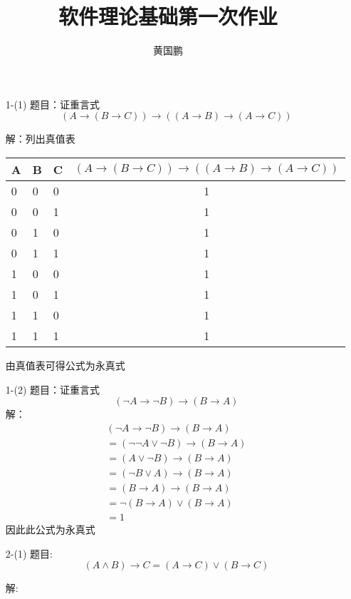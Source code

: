 \documentclass[11pt,oneside,a4paper]{article}
\author{黄国鹏}
\title{软件理论基础第一次作业 }
\begin{document}
\maketitle
    \begin{itemize}
        \item[1-(1)]
        题目：证重言式\[(A \to (B \to C)) \to ((A \to B) \to (A \to C))\] \par
        解：列出真值表
        \begin{table}[!h]
        \centering
            \begin{tabular}{|l|l|l|c|}
            \hline
            A  & B  & C  & $(A \to (B \to C)) \to ((A \to B) \to (A \to C))$ \\ \hline
            0  & 0 &  0  & 1 \\ \hline
            0  & 0 &  1  & 1\\ \hline
            0  & 1 &  0  & 1 \\ \hline
            0  & 1 &  1  & 1 \\ \hline
            1  & 0 &  0  & 1 \\ \hline
            1  & 0 &  1  & 1 \\ \hline
            1  & 1 &  0  & 1 \\ \hline
            1  & 1 &  1  & 1 \\ \hline
            \end{tabular}
            \end{table}
        由真值表可得公式为永真式
        \item[1-(2)] 
        题目：证重言式\[(\neg A \to \neg B) \to (B \to A)\]
        解：
        \[\begin{array}{l}
            (\neg A \to \neg B) \to (B \to A)\\
             = (\neg \neg A \vee \neg B) \to (B \to A)\\
             = (A \vee \neg B) \to (B \to A)\\
             = (\neg B \vee A) \to (B \to A)\\
             = (B \to A) \to (B \to A)\\
             = \neg (B \to A) \vee (B \to A)\\
             = 1
            \end{array}\]
        因此此公式为永真式
        \item[2-(1)]
        题目:  \[(A \wedge B) \to C = (A \to C) \vee (B \to C)\] \par 
        解:
    \[\begin{array}{l}

\end{array}\]
\end{itemize}
\end{document}
